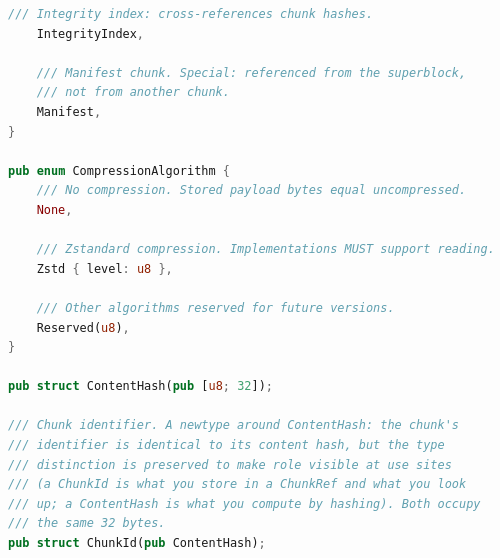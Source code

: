 \documentclass[11pt,letterpaper]{report}
\begin{document}
\begin{lstlisting}[language=Rust]
    /// Integrity index: cross-references chunk hashes.
    IntegrityIndex,

    /// Manifest chunk. Special: referenced from the superblock,
    /// not from another chunk.
    Manifest,
}

pub enum CompressionAlgorithm {
    /// No compression. Stored payload bytes equal uncompressed.
    None,

    /// Zstandard compression. Implementations MUST support reading.
    Zstd { level: u8 },

    /// Other algorithms reserved for future versions.
    Reserved(u8),
}

pub struct ContentHash(pub [u8; 32]);

/// Chunk identifier. A newtype around ContentHash: the chunk's
/// identifier is identical to its content hash, but the type
/// distinction is preserved to make role visible at use sites
/// (a ChunkId is what you store in a ChunkRef and what you look
/// up; a ContentHash is what you compute by hashing). Both occupy
/// the same 32 bytes.
pub struct ChunkId(pub ContentHash);
\end{lstlisting}
\end{document}
